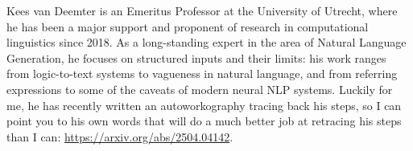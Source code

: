 Kees van Deemter is an Emeritus Professor at the University of Utrecht, where he has been a major support and proponent of research in computational linguistics since 2018.
As a long-standing expert in the area of Natural Language Generation, he focuses on structured inputs and their limits: his work ranges from logic-to-text systems to vagueness in natural language, and from referring expressions to some of the caveats of modern neural NLP systems.
Luckily for me, he has recently written an autoworkography tracing back his steps, so I can point you to his own words that will do a much better job at retracing his steps than I can: \url{https://arxiv.org/abs/2504.04142}.
